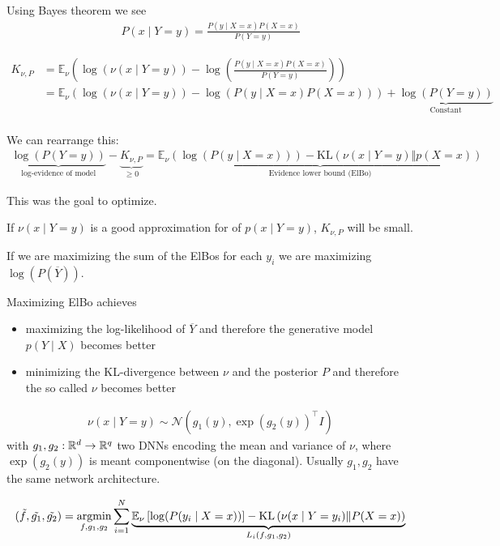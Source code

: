 Using Bayes  theorem we see 
\begin{align*}
    P(x\mid Y=y)=\frac{P(y\mid X=x)P(X=x)}{P(Y=y)}
\end{align*}

\begin{align*}
    K_{\nu,P}&=\mathbb{E}_\nu\left(\log(\nu(x\mid Y=y))-\log\left(\frac{P(y\mid X=x)P(X=x)}{P(Y=y)}\right)\right)\\
    &=\mathbb{E}_\nu\left(\log(\nu(x\mid Y=y))-\log\left(P(y\mid X=x)P(X=x)\right)\right)+\underbrace{\log\left(P(Y=y)\right)}_{\text{Constant}}\\
\end{align*}

We can rearrange this:
\begin{align*}
    \underbrace{\log\left(P(Y=y)\right)}_{\text{log-evidence of model}}-\underbrace{K_{\nu,P}}_{\geq 0}=\underbrace{\mathbb{E}_{\nu}\left(\log(P(y\mid X=x))\right)-\text{KL}\left(\nu(x\mid Y=y)\Vert p(X=x)\right)}_{\text{Evidence lower bound (ElBo)}}
\end{align*}

This was the goal to optimize.

If $\nu(x\mid Y=y)$ is a good approximation for of $p(x\mid Y=y)$, $K_{\nu,P}$ will be small.

If we are maximizing the sum of the ElBos for each $y_i$ we are maximizing $\log(P(\overline{Y}))$.

Maximizing ElBo achieves
\begin{itemize}
    \item maximizing the log-likelihood of $\overline{Y}$ and therefore the generative model $p(Y\mid X)$ becomes better 
    \item minimizing the KL-divergence between $\nu$ and the posterior $P$ and therefore the so called  $\nu$ becomes better
\end{itemize}

\begin{align*}
    \nu(x\mid Y=y)\sim\mathcal{N}(g_1(y),\exp(g_2(y))^\intercal I)
\end{align*}
with $g_1,g_2:\mathbb{R}^d\to\mathbb{R}^q$ two DNNs encoding the mean and variance of $\nu$,
where $\exp(g_2(y))$ is meant componentwise (on the diagonal). Usually $g_1,g_2$ have the same network architecture.

\begin{align*}
    (\tilde{f},\tilde{g_1},\tilde{g_2})=\operatorname*{\text{argmin}}_{f,g_1,g_2}\sum_{i=1}^N \underbrace{\mathbb{E}_\nu\left[\log(P(y_i\mid X=x))\right]-\text{KL}\left(\nu(x\mid Y=y_i)\Vert P(X=x)\right)}_{L_i(f,g_1,g_2)}
\end{align*}


